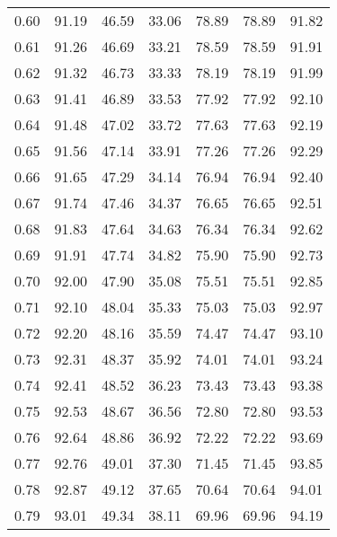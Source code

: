 \begin{tabular}{|c|c|c|c|c|c|c|}
      0.60 &     91.19 &     46.59 &      33.06 &   78.89 &      78.89 &         91.82 \\
      0.61 &     91.26 &     46.69 &      33.21 &   78.59 &      78.59 &         91.91 \\
      0.62 &     91.32 &     46.73 &      33.33 &   78.19 &      78.19 &         91.99 \\
      0.63 &     91.41 &     46.89 &      33.53 &   77.92 &      77.92 &         92.10 \\
      0.64 &     91.48 &     47.02 &      33.72 &   77.63 &      77.63 &         92.19 \\
      0.65 &     91.56 &     47.14 &      33.91 &   77.26 &      77.26 &         92.29 \\
      0.66 &     91.65 &     47.29 &      34.14 &   76.94 &      76.94 &         92.40 \\
      0.67 &     91.74 &     47.46 &      34.37 &   76.65 &      76.65 &         92.51 \\
      0.68 &     91.83 &     47.64 &      34.63 &   76.34 &      76.34 &         92.62 \\
      0.69 &     91.91 &     47.74 &      34.82 &   75.90 &      75.90 &         92.73 \\
      0.70 &     92.00 &     47.90 &      35.08 &   75.51 &      75.51 &         92.85 \\
      0.71 &     92.10 &     48.04 &      35.33 &   75.03 &      75.03 &         92.97 \\
      0.72 &     92.20 &     48.16 &      35.59 &   74.47 &      74.47 &         93.10 \\
      0.73 &     92.31 &     48.37 &      35.92 &   74.01 &      74.01 &         93.24 \\
      0.74 &     92.41 &     48.52 &      36.23 &   73.43 &      73.43 &         93.38 \\
      0.75 &     92.53 &     48.67 &      36.56 &   72.80 &      72.80 &         93.53 \\
      0.76 &     92.64 &     48.86 &      36.92 &   72.22 &      72.22 &         93.69 \\
      0.77 &     92.76 &     49.01 &      37.30 &   71.45 &      71.45 &         93.85 \\
      0.78 &     92.87 &     49.12 &      37.65 &   70.64 &      70.64 &         94.01 \\
      0.79 &     93.01 &     49.34 &      38.11 &   69.96 &      69.96 &         94.19 \\

\end{tabular}
